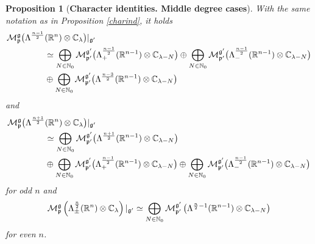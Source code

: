 \documentclass[a4paper,12pt,reqno]{amsart}
\newtheorem{prop}[theorem]{Proposition}
\numberwithin{theorem}{subsection}
\numberwithin{equation}{section}
\begin{document}
\begin{prop}[\bf Character identities. Middle degree cases]\label{charind2} With the same notation as in
Proposition \ref{charind}, it holds
\begin{align}\label{diag-branch-md-odd+}
   {\fam2 M}^{{\mathfrak g}}_{{\mathfrak p}} \big(\Lambda^{\frac{n-1}{2}} & ({\mathbb{R}}^n) \otimes {\mathbb{C}}_\lambda \big)|_{{{\mathfrak g}}^\prime} \notag \\
   & \simeq \bigoplus_{N \in {\mathbb{N}}_0} {\fam2M}^{{{\mathfrak g}}^\prime}_{{{\mathfrak p}}^\prime}
   \big(\Lambda_+^{\frac{n-1}{2}}({\mathbb{R}}^{n-1}) \otimes {\mathbb{C}}_{\lambda-N} \big)
   \oplus \bigoplus_{N \in {\mathbb{N}}_0} {\fam2M}^{{{\mathfrak g}}^\prime}_{{{\mathfrak p}}^\prime} \big(\Lambda_-^{\frac{n-1}{2}}({\mathbb{R}}^{n-1})
   \otimes{\mathbb{C}}_{\lambda-N}\big) \notag \\
   & \oplus \bigoplus_{N \in {\mathbb{N}}_0} {\fam2M}^{{{\mathfrak g}}^\prime}_{{{\mathfrak p}}^\prime}
   \big(\Lambda^{\frac{n-3}{2}}({\mathbb{R}}^{n-1}) \otimes {\mathbb{C}}_{\lambda-N} \big)
\end{align}
and
\begin{align}\label{diag-branch-md-odd-}
   {\fam2 M}^{{\mathfrak g}}_{{\mathfrak p}} \big(\Lambda^{\frac{n+1}{2}}& ({\mathbb{R}}^n) \otimes {\mathbb{C}}_\lambda
   \big)|_{{{\mathfrak g}}^\prime} \notag \\
   & \simeq  \bigoplus_{N \in {\mathbb{N}}_0} {\fam2M}^{{{\mathfrak g}}^\prime}_{{{\mathfrak p}}^\prime}
   \big(\Lambda^{\frac{n+1}{2}}({\mathbb{R}}^{n-1}) \otimes {\mathbb{C}}_{\lambda-N} \big) \notag \\
   & \oplus \bigoplus_{N \in {\mathbb{N}}_0} {\fam2M}^{{{\mathfrak g}}^\prime}_{{{\mathfrak p}}^\prime}
   \big(\Lambda_+^{\frac{n-1}{2}}({\mathbb{R}}^{n-1}) \otimes {\mathbb{C}}_{\lambda-N} \big)
   \oplus \bigoplus_{N \in {\mathbb{N}}_0} {\fam2M}^{{{\mathfrak g}}^\prime}_{{{\mathfrak p}}^\prime}
   \big(\Lambda_-^{\frac{n-1}{2}}({\mathbb{R}}^{n-1}) \otimes{\mathbb{C}}_{\lambda-N}\big)
\end{align}
for odd $n$ and
\begin{equation}\label{diag-branch-md-even}
  {\fam2 M}^{{\mathfrak g}}_{{\mathfrak p}}\left(\Lambda_\pm^{\frac{n}{2}}({\mathbb{R}}^n) \otimes {\mathbb{C}}_\lambda\right)|_{{{\mathfrak g}}^\prime}
  \simeq \bigoplus_{N \in {\mathbb{N}}_0} {\fam2M}^{{{\mathfrak g}}^\prime}_{{{\mathfrak p}}^\prime}
  \left(\Lambda^{\frac{n}{2}-1}({\mathbb{R}}^{n-1}) \otimes {\mathbb{C}}_{\lambda-N}\right)
\end{equation}
for even $n$.
\end{prop}
\end{document}
